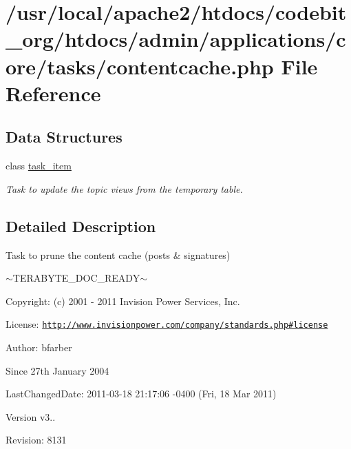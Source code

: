 \hypertarget{contentcache_8php}{\section{/usr/local/apache2/htdocs/codebit\-\_\-org/htdocs/admin/applications/core/tasks/contentcache.php File Reference}
\label{contentcache_8php}
}
\subsection*{Data Structures}
\begin{DoxyCompactItemize}
\item 
class \hyperlink{classtask__item}{task\-\_\-item}
\begin{DoxyCompactList}\small\item\em Task to update the topic views from the temporary table. \end{DoxyCompactList}\end{DoxyCompactItemize}


\subsection{Detailed Description}
\begin{DoxyVerb}  Task to prune the content cache (posts & signatures)
\end{DoxyVerb}
 $\sim$\-T\-E\-R\-A\-B\-Y\-T\-E\-\_\-\-D\-O\-C\-\_\-\-R\-E\-A\-D\-Y$\sim$ \begin{DoxyParagraph}{Copyright\-:}
(c) 2001 -\/ 2011 Invision Power Services, Inc.
\end{DoxyParagraph}
\begin{DoxyParagraph}{License\-:}
\href{http://www.invisionpower.com/company/standards.php#license}{\tt http\-://www.\-invisionpower.\-com/company/standards.\-php\#license}
\end{DoxyParagraph}
\begin{DoxyParagraph}{Author\-:}
bfarber 
\end{DoxyParagraph}
\begin{DoxySince}{Since}
27th January 2004 
\end{DoxySince}
\begin{DoxyParagraph}{Last\-Changed\-Date\-:}
2011-\/03-\/18 21\-:17\-:06 -\/0400 (Fri, 18 Mar 2011) 
\end{DoxyParagraph}
\begin{DoxyVersion}{Version}
v3.. 
\end{DoxyVersion}
\begin{DoxyParagraph}{Revision\-:}
8131 
\end{DoxyParagraph}
